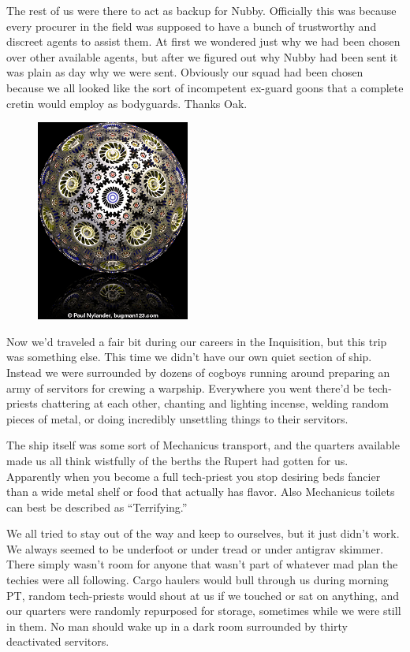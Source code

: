 The rest of us were there to act as backup for Nubby. 
Officially this was because every procurer in the field was supposed to have a bunch of trustworthy and discreet agents to assist them. 
At first we wondered just why we had been chosen over other available agents, but after we figured out why Nubby had been sent it was plain as day why we were sent. 
Obviously our squad had been chosen because we all looked like the sort of incompetent ex-guard goons that a complete cretin would employ as bodyguards. 
Thanks Oak.

\begin{figure}
	\begin{center}
		\includegraphics[width=\figwidth]{pics/7/5.png}
	\end{center}
\end{figure}
Now we’d traveled a fair bit during our careers in the Inquisition, but this trip was something else. 
This time we didn’t have our own quiet section of ship. 
Instead we were surrounded by dozens of cogboys running around preparing an army of servitors for crewing a warpship. 
Everywhere you went there’d be tech-priests chattering at each other, chanting and lighting incense, welding random pieces of metal, or doing incredibly unsettling things to their servitors.

The ship itself was some sort of Mechanicus transport, and the quarters available made us all think wistfully of the berths the Rupert had gotten for us. 
Apparently when you become a full tech-priest you stop desiring beds fancier than a wide metal shelf or food that actually has flavor. 
Also Mechanicus toilets can best be described as “Terrifying.”

We all tried to stay out of the way and keep to ourselves, but it just didn’t work. 
We always seemed to be underfoot or under tread or under antigrav skimmer. 
There simply wasn’t room for anyone that wasn’t part of whatever mad plan the techies were all following. 
Cargo haulers would bull through us during morning PT, random tech-priests would shout at us if we touched or sat on anything, and our quarters were randomly repurposed for storage, sometimes while we were still in them. 
No man should wake up in a dark room surrounded by thirty deactivated servitors.


